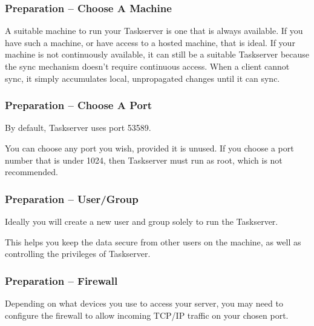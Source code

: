 \documentclass[t,handout]{beamer}
\begin{document}

\begin{frame}[fragile]\frametitle{Preparation -- Choose A  Machine}
    \vfill
	A suitable machine to run your Taskserver is one that is always available. If you have such a machine, or have access to a hosted machine, that is ideal.\pause
    \vfill
	{\small If your machine is not continuously available, it can still be a suitable Taskserver because the sync mechanism doesn't require continuous access. When a client cannot sync, it simply accumulates local, unpropagated changes until it can sync.}
\end{frame}

\begin{frame}[fragile]\frametitle{Preparation -- Choose A  Port}
	\vfill
	By default, Taskserver uses port 53589. \pause

    You can choose any port you wish, provided it is unused. If you choose a port number that is under 1024, then Taskserver must run as root, which is not recommended.
\end{frame}

\begin{frame}[fragile]\frametitle{Preparation -- User/Group}
	\vfill
    Ideally you will create a new user and group solely to run the Taskserver.

    This helps you keep the data secure from other users on the machine, as well as controlling the privileges of Taskserver.
\end{frame}

\begin{frame}[fragile]\frametitle{Preparation -- Firewall}
	\vfill
	Depending on what devices you use to access your server, you may need to configure the firewall to allow incoming TCP/IP traffic on your chosen port.
\end{frame}
\end{document}
